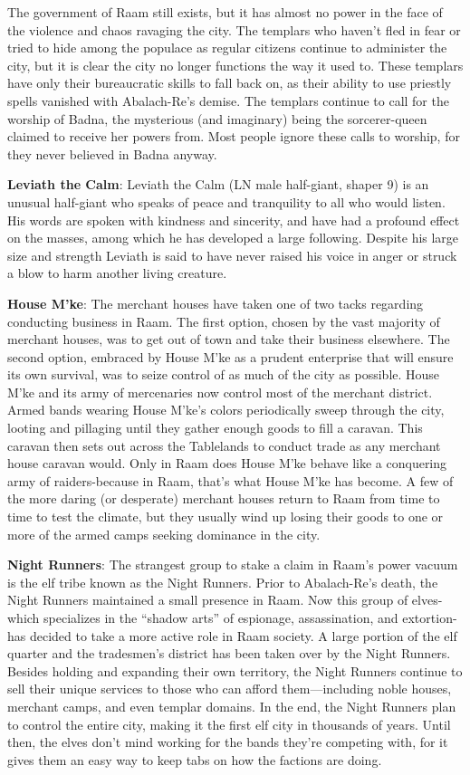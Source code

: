 {
	The government of Raam still exists, but it has almost no power in the face of the violence and chaos ravaging the city. The templars who haven't fled in fear or tried to hide among the populace as regular citizens continue to administer the city, but it is clear the city no longer functions the way it used to. These templars have only their bureaucratic skills to fall back on, as their ability to use priestly spells vanished with Abalach-Re's demise. The templars continue to call for the worship of Badna, the mysterious (and imaginary) being the sorcerer-queen claimed to receive her powers from. Most people ignore these calls to worship, for they never believed in Badna anyway.
}
{
	\textbf{Leviath the Calm}: Leviath the Calm (LN male half-giant, shaper 9) is an unusual half-giant who speaks of peace and tranquility to all who would listen. His words are spoken with kindness and sincerity, and have had a profound effect on the masses, among which he has developed a large following. Despite his large size and strength Leviath is said to have never raised his voice in anger or struck a blow to harm another living creature.

	\textbf{House M'ke}: The merchant houses have taken one of two tacks regarding conducting business in Raam. The first option, chosen by the vast majority of merchant houses, was to get out of town and take their business elsewhere. The second option, embraced by House M'ke as a prudent enterprise that will ensure its own survival, was to seize control of as much of the city as possible. House M'ke and its army of mercenaries now control most of the merchant district. Armed bands wearing House M'ke's colors periodically sweep through the city, looting and pillaging until they gather enough goods to fill a caravan. This caravan then sets out across the Tablelands to conduct trade as any merchant house caravan would. Only in Raam does House M'ke behave like a conquering army of raiders-because in Raam, that's what House M'ke has become. A few of the more daring (or desperate) merchant houses return to Raam from time to time to test the climate, but they usually wind up losing their goods to one or more of the armed camps seeking dominance in the city.

	\textbf{Night Runners}: The strangest group to stake a claim in Raam's power vacuum is the elf tribe known as the Night Runners. Prior to Abalach-Re's death, the Night Runners maintained a small presence in Raam. Now this group of elves-which specializes in the ``shadow arts'' of espionage, assassination, and extortion-has decided to take a more active role in Raam society. A large portion of the elf quarter and the tradesmen's district has been taken over by the Night Runners. Besides holding and expanding their own territory, the Night Runners continue to sell their unique services to those who can afford them---including noble houses, merchant camps, and even templar domains. In the end, the Night Runners plan to control the entire city, making it the first elf city in thousands of years. Until then, the elves don't mind working for the bands they're competing with, for it gives them an easy way to keep tabs on how the factions are doing.

}
